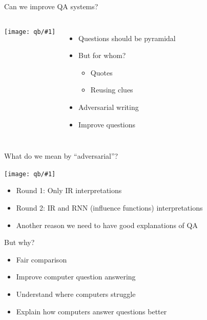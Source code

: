 \documentclass[xcolor=dvipsnames]{beamer}
\newcommand{\fsi}[2]{
\begin{frame}[plain]
\vspace*{-1pt}
\makebox[\linewidth]{\texttt{[image: \#1]}}
\begin{center}
#2
\end{center}
\end{frame}
}
\newcommand{\gfxq}[2]{
\begin{center}
	\texttt{[image: qb/\#1]}
\end{center}
}
\begin{document}
\begin{frame}{Can we improve QA systems?}

\begin{columns}
     \gfxq{trick/pyramid}{.9}
     \begin{itemize}
       \item Questions should be pyramidal
       \item But for whom?
         \begin{itemize}
           \item Quotes
           \item Reusing clues
         \end{itemize}
         \item Adversarial writing
         \item Improve questions
     \end{itemize}
\end{columns}
\end{frame}



\fsi{general_figures/blackbox}{}
  
\begin{frame}{What do we mean by ``adversarial''?}

  \gfxq{trick/flow_chart_horizontal_label}{1.0}

  \begin{itemize}
    \item Round 1: Only IR interpretations
    \item Round 2: IR and RNN (influence functions) interpretations
      \pause
    \item Another reason we need to have good explanations of QA
  \end{itemize}

\end{frame}

\begin{frame}{But why?}

  \begin{itemize}
  \item Fair comparison
  \item Improve computer question answering
  \item Understand where computers struggle
    \item Explain how computers answer questions better
  \end{itemize}

\end{frame}
\end{document}
